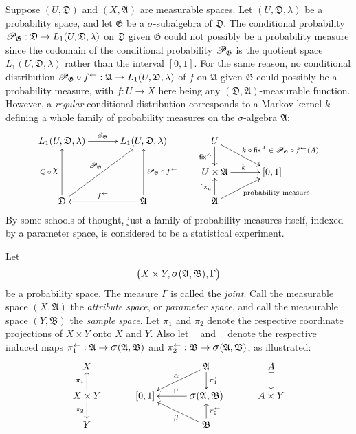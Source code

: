 \documentclass[
twoside=true,
paper=letter,
fontsize=9pt,
pagesize=auto,
leqno,
openany,
headsepline,
overfullrule,
]{scrbook}
\theoremstyle{plain}
\theoremstyle{plain}
\theoremstyle{definition}
\theoremstyle{bfnoteitalic}
\theoremstyle{bfnoteroman}
\newcommand{\sigalg}[1]{\mathfrak{#1}}
\newcommand{\cali}[1]{\mathscr{#1}}
\newcommand{\sfop}[1]{\mathsf{#1}}
\newcommand{\condexpop}[1]{\mathop{\cali{E}\hspace{-1pt}}\nolimits_{#1}}
\newcommand{\condprobop}[1]{\mathop{\cali{P}\hspace{-1pt}}\nolimits_{#1}}
\newcommand{\sagb}{\mathop{\hbox{\large{$\sigma$}}}\nolimits}
\newcommand{\textsigma}{\hbox{\large{$\sigma$}}\kern-1pt}
\newcommand{\charfunction}[1]{\mathop{{\raisebox{2pt}{$\chi$}}_{#1}}}
\newcommand{\preimage}[1]{\mathop{#1^{\leftarrow}}}
\newcommand{\sigmaalgebra}{\sigalg{A}}
\newcommand{\productsig}[2]{\sagb(#1,#2)}
\newcommand{\funcf}{f}
\newcommand{\funck}{k}
\newcommand{\measurespace}{X}
\newcommand{\measurespaceii}{Y}
\newcommand{\measlambda}{\lambda}
\newcommand{\seti}{A}
\newcommand{\projectionone}{\pi_1}
\newcommand{\projectiontwo}{\pi_2}
\newcommand{\fixinthefirst}[1]{\sfop{fix}_{#1}}
\newcommand{\fixinthesecond}[1]{\sfop{fix}^{#1}}
\newcommand{\uspace}{U}%
\newcommand{\pspace}{\measurespace}%
\newcommand{\sspace}{\measurespaceii}%
\newcommand{\uspaceelt}{u}
\newcommand{\uspacesig}{\sigalg{D}}
\newcommand{\sspacesig}{\sigalg{B}}
\newcommand{\pspacesig}{\sigalg{A}}
\newcommand{\measonprod}{\Gamma}%
\newcommand{\marginalone}{\alpha}%
\newcommand{\marginaltwo}{\beta}%
\begin{document}
Suppose
$(\uspace, \uspacesig)$ and
$(\measurespace, \sigmaalgebra)$ are measurable spaces.
Let
$(\uspace,\uspacesig,\measlambda)$
be a probability space, and let $\sigalg{G}$ be a \textsigma-subalgebra of
$\uspacesig$.
The conditional probability
$
\condprobop{\sigalg{G}}:
\uspacesig \to
L_1(\uspace,\uspacesig,\measlambda)
$
on $\uspacesig$ given $\sigalg{G}$
could not possibly be a probability measure since the  codomain
of the conditional probability $\condprobop{\sigalg{G}}$ is the quotient space
$L_1(\uspace,\uspacesig,\measlambda)$ rather than the interval $[0,1]$.
For the same reason, no conditional distribution
${\condprobop{\sigalg{G}}}\circ \preimage{\funcf}
: \sigmaalgebra \to L_1(\uspace,\uspacesig,\measlambda)$
of $\funcf$ on $\sigmaalgebra$ given $\sigalg{G}$
could possibly be a probability measure,
with $\funcf:\uspace\to\measurespace$ here being any
$(\uspacesig,\sigmaalgebra)$\hyp{}measurable function.
However, a \emph{regular} conditional distribution corresponds to a Markov kernel $\funck$ defining a whole family of probability measures on the
\textsigma-algebra $\sigmaalgebra$:
\[
\xymatrix@R=16pt@C=30pt{
L_1(\uspace,\uspacesig,\measlambda)
\ar[r]^{\condexpop{\sigalg{G}}}
& L_1(\uspace,\uspacesig,\measlambda)
& \uspace
\ar[d]_-{\fixinthesecond{\seti}}
\ar[dr]^{\qquad\text{$\funck\circ\fixinthesecond{\seti} \in \condprobop{\sigalg{G}}\circ \preimage{\funcf}(\seti)$}}
\\
&
& \uspace\times\sigmaalgebra \ar[r]^{\funck}
& [0,1]
\\
\uspacesig
\ar[uu]^{Q\,\circ\, \charfunction{}}
\ar[uur]^{\condprobop{\sigalg{G}}}
& \sigmaalgebra
\ar[uu]_{\condprobop{\sigalg{G}}\circ \preimage{\funcf}}
\ar[l]_{\preimage{\funcf}}
& \sigmaalgebra
\ar[ur]_{\qquad\text{probability measure}}
\ar[u]^{\fixinthefirst{\uspaceelt}}
&
\\
}
\]
By some schools of thought, just a family
of probability measures itself, indexed by a parameter space, is considered to be a statistical experiment.

Let
\[
\bigl(\pspace\times\sspace,
\productsig{\pspacesig}{\sspacesig},
\measonprod\bigr)
\]
be a probability space.
The measure $\measonprod$ is called the \emph{joint}.
Call the measurable space $(\pspace, \pspacesig)$ the \emph{attribute space}, or \emph{parameter space}, and call the measurable space
$(\sspace, \sspacesig)$ the
\emph{sample space}.
Let $\projectionone$ and $\projectiontwo$ denote the respective coordinate projections of
$\pspace\times\sspace$ onto $\pspace$ and $\sspace$. Also let $\preimage{\projectionone}$ and
$\preimage{\projectiontwo}$ denote the respective induced maps
$\preimage{\projectionone}:\pspacesig\to\productsig{\pspacesig}{\sspacesig}$
and
$\preimage{\projectiontwo}:\sspacesig\to\productsig{\pspacesig}{\sspacesig}$, as illustrated:
\[
\xymatrix@R=16pt@C=30pt{
\pspace
&
&
\pspacesig
\ar[d]^-{\preimage{\projectionone}}
\ar[dl]_-{\marginalone}
& \seti \ar@{|->}[d]
\\
\pspace\times\sspace \ar[u]^-{\projectionone} \ar[d]_-{\projectiontwo} &
[0,1] &
\productsig{\pspacesig}{\sspacesig}  \ar[l]_\measonprod
& \seti\times\sspace
\\
\sspace
&
&
\sspacesig
\ar[u]_-{\preimage{\projectiontwo}}
\ar[ul]^-{\marginaltwo}
\\
}
\]
\end{document}
